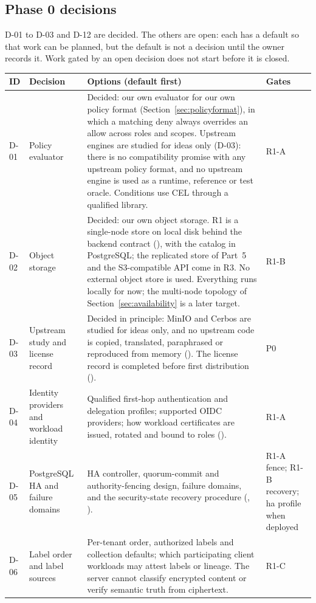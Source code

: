 \subsection{Phase 0 decisions}\label{sec:decisions}
D-01 to D-03 and D-12 are decided. The others are open: each has a default so that work can be planned, but the default is not a decision until the owner records it. Work gated by an open decision does not start before it is closed.
\begin{longtable}{@{}P{0.06\textwidth}P{0.22\textwidth}P{0.46\textwidth}P{0.12\textwidth}@{}}
\toprule ID & Decision & Options (default first) & Gates\\\midrule\endhead
D-01 & Policy evaluator & Decided: our own evaluator for our own policy format  (Section~\ref{sec:policyformat}), in which a matching deny always overrides an allow across roles and scopes. Upstream engines are studied for ideas only (D-03): there is no compatibility promise with any upstream policy format, and no upstream engine is used as a runtime, reference or test oracle. Conditions use CEL through a qualified library. & R1-A\\
D-02 & Object storage & Decided: our own object storage. R1 is a single-node store on local disk behind the backend contract (), with the catalog in PostgreSQL; the replicated store of Part~5 and the S3-compatible API come in R3. No external object store is used. Everything runs locally for now; the multi-node topology of Section~\ref{sec:availability} is a later target. & R1-B\\
D-03 & Upstream study and license record & Decided in principle: MinIO and Cerbos are studied for ideas only, and no upstream code is copied, translated, paraphrased or reproduced from memory (). The license record is completed before first distribution (). & P0\\
D-04 & Identity providers and workload identity & Qualified first-hop authentication and delegation profiles; supported OIDC providers; how workload certificates are issued, rotated and bound to roles (). & R1-A\\
D-05 & PostgreSQL HA and failure domains & HA controller, quorum-commit and authority-fencing design, failure domains, and the security-state recovery procedure (, ). & R1-A fence; R1-B recovery; ha profile when deployed\\
D-06 & Label order and label sources & Per-tenant order, authorized labels and collection defaults; which participating client workloads may attest labels or lineage. The server cannot classify encrypted content or verify semantic truth from ciphertext. & R1-C\\

\end{longtable}
